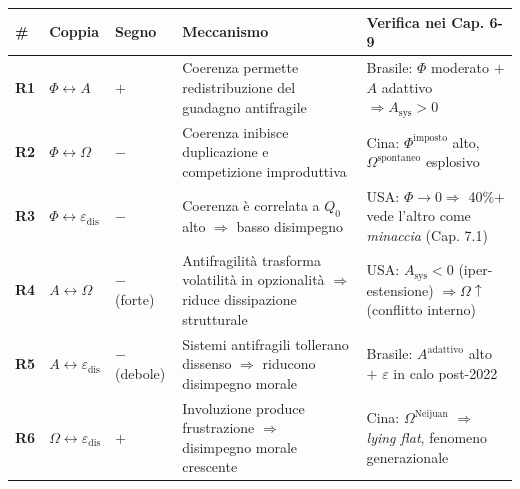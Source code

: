 {\def\LTcaptype{none} %
{\small\begin{longtable}[]{@{}
  >{\raggedright\arraybackslash}p{}
  >{\raggedright\arraybackslash}p{}
  >{\raggedright\arraybackslash}p{}
  >{\raggedright\arraybackslash}p{}
  >{\raggedright\arraybackslash}p{}@{}}
\toprule\noalign{}
\begin{minipage}[b]{\linewidth}\raggedright
\#
\end{minipage} & \begin{minipage}[b]{\linewidth}\raggedright
Coppia
\end{minipage} & \begin{minipage}[b]{\linewidth}\raggedright
Segno
\end{minipage} & \begin{minipage}[b]{\linewidth}\raggedright
Meccanismo
\end{minipage} & \begin{minipage}[b]{\linewidth}\raggedright
Verifica nei Cap. 6-9
\end{minipage} \\
\midrule\noalign{}
\endhead
\bottomrule\noalign{}
\endlastfoot
\textbf{R1} & \(\Phi \leftrightarrow A\) & \(+\) & Coerenza permette
redistribuzione del guadagno antifragile & Brasile: \(\Phi\) moderato
\(+\) \(A\) adattivo \(\Rightarrow A_{\text{sys}} > 0\) \\
\textbf{R2} & \(\Phi \leftrightarrow \Omega\) & \(-\) & Coerenza
inibisce duplicazione e competizione improduttiva & Cina:
\(\Phi^{\text{imposto}}\) alto, \(\Omega^{\text{spontaneo}}\)
esplosivo \\
\textbf{R3} & \(\Phi \leftrightarrow \varepsilon_{\text{dis}}\) & \(-\)
& Coerenza è correlata a \(Q_0\) alto \(\Rightarrow\) basso disimpegno &
USA: \(\Phi \to 0 \Rightarrow\) 40\%+ vede l'altro come \emph{minaccia}
(Cap. 7.1) \\
\textbf{R4} & \(A \leftrightarrow \Omega\) & \(-\) (forte) &
Antifragilità trasforma volatilità in opzionalità \(\Rightarrow\) riduce
dissipazione strutturale & USA: \(A_{\text{sys}} < 0\) (iper-estensione)
\(\Rightarrow \Omega \uparrow\) (conflitto interno) \\
\textbf{R5} & \(A \leftrightarrow \varepsilon_{\text{dis}}\) & \(-\)
(debole) & Sistemi antifragili tollerano dissenso \(\Rightarrow\)
riducono disimpegno morale & Brasile: \(A^{\text{adattivo}}\) alto \(+\)
\(\varepsilon\) in calo post-2022 \\
\textbf{R6} & \(\Omega \leftrightarrow \varepsilon_{\text{dis}}\) &
\(+\) & Involuzione produce frustrazione \(\Rightarrow\) disimpegno
morale crescente & Cina: \(\Omega^{\text{Neijuan}}\) \(\Rightarrow\)
\emph{lying flat}, fenomeno generazionale \\
\end{longtable}}
}

